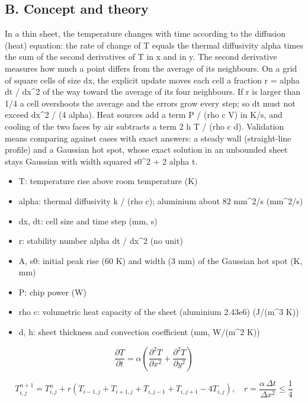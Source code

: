 \documentclass[11pt,a4paper]{article}
\begin{document}
\subsection*{B. Concept and theory}
In a thin sheet, the temperature changes with time according to the diffusion (heat) equation: the rate of change of T equals the thermal diffusivity alpha times the sum of the second derivatives of T in x and in y. The second derivative measures how much a point differs from the average of its neighbours. On a grid of square cells of size dx, the explicit update moves each cell a fraction r = alpha dt / dx\textasciicircum{}2 of the way toward the average of its four neighbours. If r is larger than 1/4 a cell overshoots the average and the errors grow every step; so dt must not exceed dx\textasciicircum{}2 / (4 alpha). Heat sources add a term P / (rho c V) in K/s, and cooling of the two faces by air subtracts a term 2 h T / (rho c d). Validation means comparing against cases with exact answers: a steady wall (straight-line profile) and a Gaussian hot spot, whose exact solution in an unbounded sheet stays Gaussian with width squared s0\textasciicircum{}2 + 2 alpha t.

\begin{itemize}[nosep]
\item T: temperature rise above room temperature (K)
\item alpha: thermal diffusivity k / (rho c); aluminium about 82 mm\textasciicircum{}2/s (mm\textasciicircum{}2/s)
\item dx, dt: cell size and time step (mm, s)
\item r: stability number alpha dt / dx\textasciicircum{}2 (no unit)
\item A, s0: initial peak rise (60 K) and width (3 mm) of the Gaussian hot spot (K, mm)
\item P: chip power (W)
\item rho c: volumetric heat capacity of the sheet (aluminium 2.43e6) (J/(m\textasciicircum{}3 K))
\item d, h: sheet thickness and convection coefficient (mm, W/(m\textasciicircum{}2 K))
\end{itemize}

\begin{equation*}
\frac{\partial T}{\partial t}=\alpha\left(\frac{\partial^2 T}{\partial x^2}+\frac{\partial^2 T}{\partial y^2}\right)
\end{equation*}

\begin{equation*}
T^{n+1}_{i,j}=T^{n}_{i,j}+r\left(T_{i-1,j}+T_{i+1,j}+T_{i,j-1}+T_{i,j+1}-4T_{i,j}\right),\quad r=\frac{\alpha\,\Delta t}{\Delta x^2}\le\frac14
\end{equation*}
\end{document}
